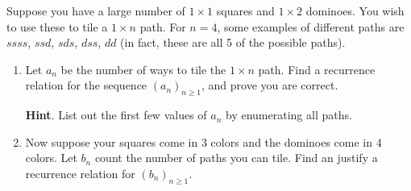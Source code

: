 \documentclass{book}
\begin{document}
\setcounter{cpjt}{139}
\addtocounter{cpjt}{-1}
\begin{activity}\label{act-dominoes}
\hypertarget{p-907}{}%
Suppose you have a large number of \(1\times 1\) squares and \(1 \times 2\) dominoes.  You wish to use these to tile a \(1 \times n\) path.  For \(n = 4\), some examples of different paths are \(ssss\), \(ssd\), \(sds\), \(dss\), \(dd\) (in fact, these are all 5 of the possible paths).%
\begin{enumerate}[font=\bfseries,label=(\alph*),ref=\alph*]
\item\label{task-171} \hypertarget{p-908}{}%
Let \(a_n\) be the number of ways to tile the \(1 \times n\) path.  Find a recurrence relation for the sequence \((a_n)_{n \ge 1}\), and prove you are correct.%
\par\smallskip%
\noindent\textbf{Hint}.\hypertarget{hint-98}{}\quad%
\hypertarget{p-909}{}%
List out the first few values of \(a_n\) by enumerating all paths.%
\item\label{task-172} \hypertarget{p-910}{}%
Now suppose your squares come in 3 colors and the dominoes come in 4 colors.  Let \(b_n\) count the number of paths you can tile.  Find an justify a recurrence relation for \((b_n)_{n \ge 1}\).%
\end{enumerate}
\end{activity}

\clearpage
\end{document}
